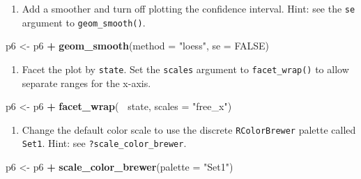 \documentclass[]{book}
\newenvironment{Shaded}{\begin{snugshade}}{\end{snugshade}}
\newcommand{\DataTypeTok}[1]{\textcolor[rgb]{0.13,0.29,0.53}{#1}}
\newcommand{\KeywordTok}[1]{\textcolor[rgb]{0.13,0.29,0.53}{\textbf{#1}}}
\newcommand{\NormalTok}[1]{#1}
\newcommand{\OperatorTok}[1]{\textcolor[rgb]{0.81,0.36,0.00}{\textbf{#1}}}
\newcommand{\OtherTok}[1]{\textcolor[rgb]{0.56,0.35,0.01}{#1}}
\newcommand{\StringTok}[1]{\textcolor[rgb]{0.31,0.60,0.02}{#1}}
\providecommand{\tightlist}{%
  \setlength{\itemsep}{0pt}\setlength{\parskip}{0pt}}
\begin{document}
\begin{enumerate}
\def\labelenumi{\arabic{enumi}.}
\setcounter{enumi}{2}
\tightlist
\item
  Add a smoother and turn off plotting the confidence interval. Hint: see the \texttt{se} argument to \texttt{geom\_smooth()}.
\end{enumerate}

\begin{Shaded}
\begin{Highlighting}[]
\NormalTok{p6 <-}\StringTok{ }\NormalTok{p6 }\OperatorTok{+}\StringTok{ }\KeywordTok{geom_smooth}\NormalTok{(}\DataTypeTok{method =} \StringTok{"loess"}\NormalTok{, }\DataTypeTok{se =} \OtherTok{FALSE}\NormalTok{) }
\end{Highlighting}
\end{Shaded}

\begin{enumerate}
\def\labelenumi{\arabic{enumi}.}
\setcounter{enumi}{3}
\tightlist
\item
  Facet the plot by \texttt{state}. Set the \texttt{scales} argument to \texttt{facet\_wrap()} to allow separate ranges for the x-axis.
\end{enumerate}

\begin{Shaded}
\begin{Highlighting}[]
\NormalTok{p6 <-}\StringTok{ }\NormalTok{p6 }\OperatorTok{+}\StringTok{ }\KeywordTok{facet_wrap}\NormalTok{(}\OperatorTok{~}\StringTok{ }\NormalTok{state, }\DataTypeTok{scales =} \StringTok{"free_x"}\NormalTok{)}
\end{Highlighting}
\end{Shaded}

\begin{enumerate}
\def\labelenumi{\arabic{enumi}.}
\setcounter{enumi}{4}
\tightlist
\item
  Change the default color scale to use the discrete \texttt{RColorBrewer} palette called \texttt{Set1}. Hint: see \texttt{?scale\_color\_brewer}.
\end{enumerate}

\begin{Shaded}
\begin{Highlighting}[]
\NormalTok{p6 <-}\StringTok{ }\NormalTok{p6 }\OperatorTok{+}\StringTok{ }\KeywordTok{scale_color_brewer}\NormalTok{(}\DataTypeTok{palette =} \StringTok{"Set1"}\NormalTok{)}
\end{Highlighting}
\end{Shaded}
\end{document}
